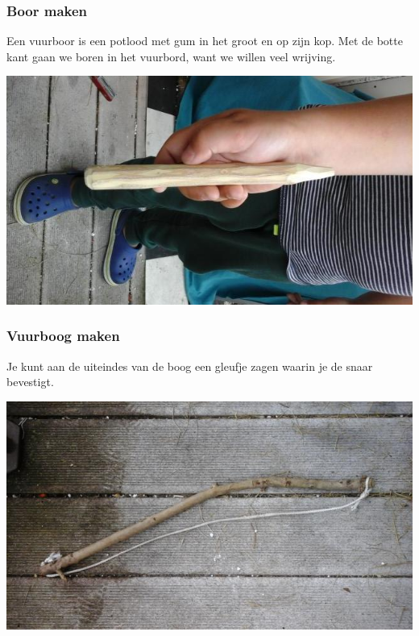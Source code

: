 \documentclass[a4paper, handout]{beamer}
\begin{document}
\begin{frame}
	\frametitle{Boor maken}
	Een vuurboor is een potlood met gum in het groot en op zijn kop. Met de botte kant gaan we boren in het vuurbord, want we willen veel wrijving.

	\includegraphics[scale=0.25]{vuurboor}
\end{frame}

\begin{frame}
	\frametitle{Vuurboog maken}
	Je kunt aan de uiteindes van de boog een gleufje zagen waarin je de snaar bevestigt.

	\includegraphics[scale=0.4]{vuurboog}
\end{frame}
\end{document}
